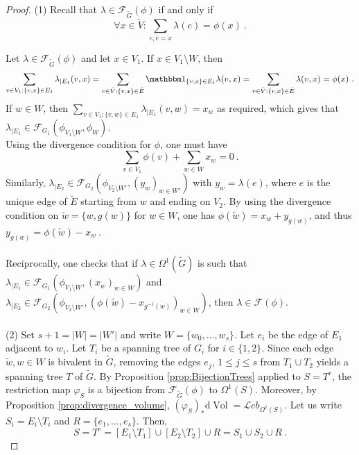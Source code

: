 \documentclass[11pt,a4paper]{amsart}
\providecommand{\diff}{\mathrm d}
\providecommand{\Vol}{\operatorname{Vol}}
\providecommand{\indic}{\mathbbm 1}
\numberwithin{equation}{section}
\theoremstyle{definition}
\begin{document}
\begin{proof}

(1) Recall that $\lambda\in\mathcal{F}_{\tilde{G}}(\phi)$ if and only if
$$\forall x \in \tilde{V}: \sum_{e,\bar{e}=x}\lambda(e)=\phi(x) \ .$$

\noindent
Let $\lambda\in \mathcal{F}_{\tilde{G}}(\phi)$ and let $x \in V_1$. 
If $x \in V_1 \setminus W$, then 
\begin{equation*}
     \sum_{v \in V_1 : \{v, x\} \in E_1} \lambda_{\vert E_1}(v, x) 
     = \sum_{v \in \tilde{V} : \{v, x\} \in \tilde{E}} \indic_{\{v, x\} \in E_1} \lambda(v, x) 
    = \sum_{v \in \tilde{V} : \{v, x\} \in \tilde{E}} \lambda(v, x) = \phi(x) \ .
\end{equation*}
If $w \in W$, then $ \sum_{v \in V_1 : \{v, w\} \in E_1} \lambda_{\vert E_1}(v, w) = x_w$ 
as required, which gives that $\lambda_{\vert E_1}\in 
\mathcal{F}_{G_1}(\phi_{V_1\setminus W},\phi_W)$. \\
Using the divergence condition for $\phi$, one must have 
$$\sum_{v\in V_1}\phi(v)+\sum_{w\in W}x_w=0 \ .$$
Similarly, $\lambda_{\vert E_2}\in \mathcal{F}_{G_2}(\phi_{V_2\setminus W'},(y_w)_{w\in W'})$ 
with $y_w=\lambda(e)$, where $e$ is the unique edge of $\tilde{E}$ 
starting from $w$ and ending on $V_2$. 
By using the divergence condition on $\tilde{w}=\{w,g(w)\}$ for $w\in W$, 
one has $\phi(\tilde{w})=x_w+y_{g(w)}$, and thus 
$y_{g(w)}=\phi(\tilde{w})-x_w \ .$
\\
\\
Reciprocally, one checks that if $\lambda\in \Omega^1(\tilde{G})$ is such that 
$\lambda_{\vert E_1}\in \mathcal{F}_{G_1}(\phi_{V_1\setminus W},(x_w)_{w\in W})$ and 
$\lambda_{\vert E_2}\in \mathcal{F}_{G_2}(\phi_{V_2\setminus W'},(\phi(\tilde{w})-x_{g^{-1}(w)})_{w\in W})$, 
then $\lambda\in \mathcal{F}(\phi)$.
\\
\\
(2) Set $s+1=\vert W\vert=\vert W'\vert$ and write $W=\{w_0,\ldots,w_s\}$. 
Let $e_i$ be the edge of $E_1$ adjacent to $w_i$. 
Let $T_i$ be a spanning tree of $G_i$ for $i\in \{1,2\}$. 
Since each edge $\tilde{w},w\in W$ is bivalent in $\tilde{G}$, 
removing the edges $e_j$, $1\leqslant j\leqslant s$ from $T_1\cup T_2$ yields a spanning 
tree $T$ of $\tilde{G}$. 
By Proposition \ref{prop:BijectionTrees} applied to $S=T^c$, the restriction map 
$\varphi_{S}$ is a bijection from $\mathcal{F}_{\tilde{G}}(\phi)$ to $\Omega^1(S)$. 
Moreover, by Proposition \ref{prop:divergence_volume}, 
$(\varphi_S)_* \diff\Vol=\mathcal Leb_{\Omega^1(S)}$. 
Let us write $S_i=E_{i}\setminus T_i$ and $R=\{e_1,\ldots,e_{s}\}$. Then, 
$$S = T^c=[E_{1}\setminus  T_1]\cup [E_2\setminus T_2]\cup R=S_1\cup S_2\cup R \ .$$


\end{proof}
\end{document}
